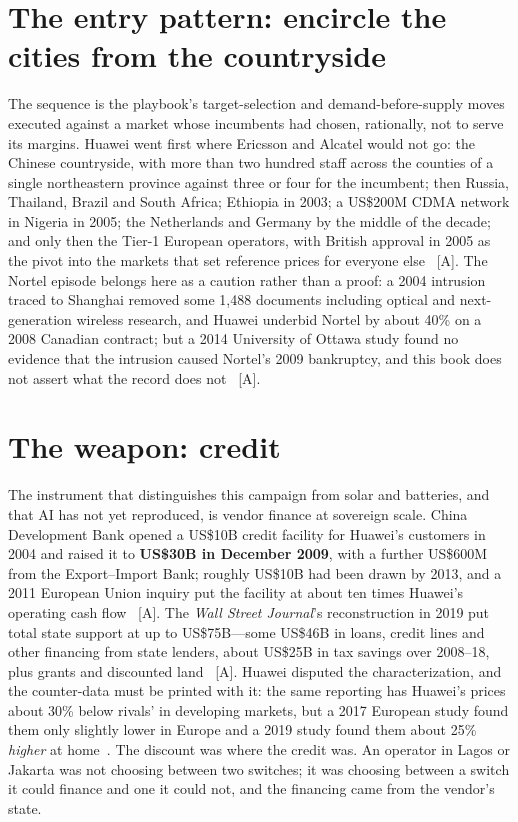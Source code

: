 \section{The entry pattern: encircle the cities from the countryside}

The sequence is the playbook's target-selection and demand-before-supply moves executed against a market whose incumbents had chosen, rationally, not to serve its margins. Huawei went first where Ericsson and Alcatel would not go: the Chinese countryside, with more than two hundred staff across the counties of a single northeastern province against three or four for the incumbent; then Russia, Thailand, Brazil and South Africa; Ethiopia in 2003; a US\$200M CDMA network in Nigeria in 2005; the Netherlands and Germany by the middle of the decade; and only then the Tier-1 European operators, with British approval in 2005 as the pivot into the markets that set reference prices for everyone else~\cite{ahrens-huawei,dou-huawei} [A]. The Nortel episode belongs here as a caution rather than a proof: a 2004 intrusion traced to Shanghai removed some 1{,}488 documents including optical and next-generation wireless research, and Huawei underbid Nortel by about 40\% on a 2008 Canadian contract; but a 2014 University of Ottawa study found no evidence that the intrusion caused Nortel's 2009 bankruptcy, and this book does not assert what the record does not~\cite{dou-huawei} [A].

\section{The weapon: credit}

The instrument that distinguishes this campaign from solar and batteries, and that AI has not yet reproduced, is vendor finance at sovereign scale. China Development Bank opened a US\$10B credit facility for Huawei's customers in 2004 and raised it to \textbf{US\$30B in December 2009}, with a further US\$600M from the Export--Import Bank; roughly US\$10B had been drawn by 2013, and a 2011 European Union inquiry put the facility at about ten times Huawei's operating cash flow~\cite{ahrens-huawei,wsj-huawei-state} [A]. The \emph{Wall Street Journal}'s reconstruction in 2019 put total state support at up to US\$75B---some US\$46B in loans, credit lines and other financing from state lenders, about US\$25B in tax savings over 2008--18, plus grants and discounted land~\cite{wsj-huawei-state} [A]. Huawei disputed the characterization, and the counter-data must be printed with it: the same reporting has Huawei's prices about 30\% below rivals' in developing markets, but a 2017 European study found them only slightly lower in Europe and a 2019 study found them about 25\% \emph{higher} at home~\cite{wsj-huawei-state}. The discount was where the credit was. An operator in Lagos or Jakarta was not choosing between two switches; it was choosing between a switch it could finance and one it could not, and the financing came from the vendor's state.

